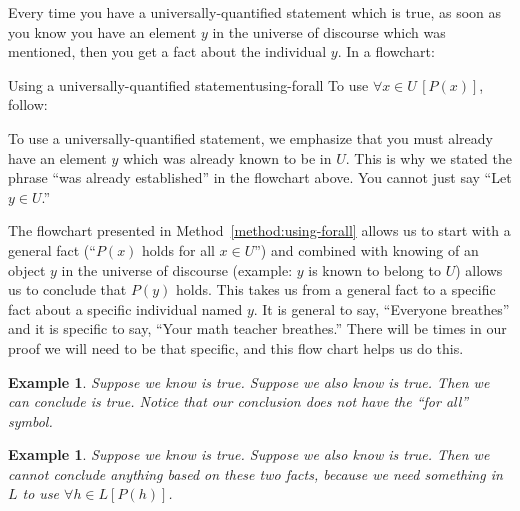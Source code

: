 \documentclass{book}
\newcounter{ekcounter}%
\theoremstyle{ekimcustom}
\newtheorem{example}[ekcounter]{Example}
\begin{document}
Every time you have a universally-quantified statement which is true, as soon as you know you have an element $y$ in the universe of discourse which was mentioned, then you get a fact about the individual $y$. In a flowchart:
\begin{bmethod}{Using a universally-quantified statement}{using-forall}
To use $\forall x \in U\,[P(x)]$, follow:
\begin{center}
\end{center}
\end{bmethod}

\begin{bwarning}{}{}
To use a universally-quantified statement, we emphasize that you must already have an element $y$ which was already known to be in $U$. This is why we stated the phrase ``was already established'' in the flowchart above. You cannot just say ``Let $y \in U$.''
\end{bwarning}
The flowchart presented in Method~\ref{method:using-forall} allows us to start with a general fact (``$P(x)$ holds for all $x \in U$'') and combined with knowing of an object $y$ in the universe of discourse (example: $y$ is known to belong to $U$) allows us to conclude that $P(y)$ holds. This takes us from a general fact to a specific fact about a specific individual named $y$. It is general to say, ``Everyone breathes'' and it is specific to say, ``Your math teacher breathes.'' There will be times in our proof we will need to be that specific, and this flow chart helps us do this.

\begin{example}
Suppose we know  is true. Suppose we also know  is true. Then we can conclude  is true. Notice that our conclusion does not have the ``for all'' symbol.
\end{example}
\begin{example}
Suppose we know  is true. Suppose we also know  is true. Then we cannot conclude anything based on these two facts, because we need something in $L$ to use $\forall h \in L [P(h)]$.
\end{example}
\end{document}
